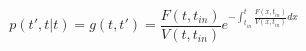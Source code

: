 \begin{equation}
p(t',t|t)=g(t,t')= \frac{F(t,t_{in})}{V(t,t_{in})} e^{-\int_{t_{in}}^t \frac{F(x,t_{in})}{V(x,t_{in})} dx}
\end{equation}